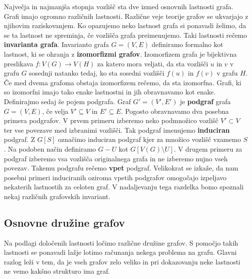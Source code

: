\documentclass[12pt,a4paper,twoside]{article}
\theoremstyle{definition} %
\theoremstyle{plain} %
\numberwithin{equation}{section}  %
\begin{document}
Največja in najmanjša stopnja vozlišč sta dve izmed osnovnih lastnosti grafa. Grafi imajo ogromno različnih lastnosti. Različne veje teorije grafov se ukvarjajo z njihovim raziskovanjem. Ko opazujemo neko lastnost grafa si ponavadi želimo, da se ta lastnost ne spreminja, če vozlišča grafa preimenujemo. Taki lastnosti rečemo \textbf{invarianta grafa}. Invarianto grafa $G = (V, E)$ definiramo formalno kot lastnost, ki se ohranja z \textbf{izomorfizmi grafov}. Izomorfizem grafa je bijektivna preslikava $f: V(G) \rightarrow V(H)$ za katero mora veljati, da sta vozlišči $u$ in $v$ v grafu $G$ sosednji natanko tedaj, ko sta sosedni vozlišči $f(u)$ in $f(v)$ v grafu $H$. Če med dvema grafoma obstaja izomorfizem rečemo, da sta izomorfna. Grafi, ki so izomorfni imajo tako enake lastnostni in jih obravnavamo kot enake. Definirajmo sedaj še pojem podgrafa. Graf $G' = (V', E')$ je \textbf{podgraf} grafa $G = (V, E)$, če velja $ V' \subseteq V$ in $E' \subseteq E$. Pogosto obravnavamo dva posebna primera podgrafov. V prvem primeru izberemo neko podmnožico vozlišč $V' \subset V$ ter vse povezave med izbranimi vozlišči. Tak podgraf imenujemo \textbf{induciran} podgraf. Z $G[S]$ označimo induciran podgraf kjer za množico vozlišč vzamemo $S$. Na podoben način definiramo $G - U$ kot $G[V(G) \setminus U]$. V drugem primeru za podgraf izberemo vsa vozlišča originalnega grafa in ne izberemo nujno vseh povezav. Takemu podgrafu rečemo \textbf{vpet} podgraf. Velikokrat se izkaže, da nam posebni primeri induciranih oziroma vpetih podgrafov omogočajo izpeljavo nekaterih lastnostih za celoten graf. V nadaljevanju tega razdelka bomo spoznali nekaj različnih grafovskih invariant.

\subsection{Osnovne družine grafov}
Na podlagi določenih lastnosti ločimo različne družine grafov. S pomočjo takih lastnosti se ponavadi lažje lotimo računanja nekega problema na grafu. Glavni razlog leži v tem, da je vseh grafov zelo veliko in pri dokazovanju neke lastnosti ne vemo kakšno strukturo ima graf. 
\end{document}
